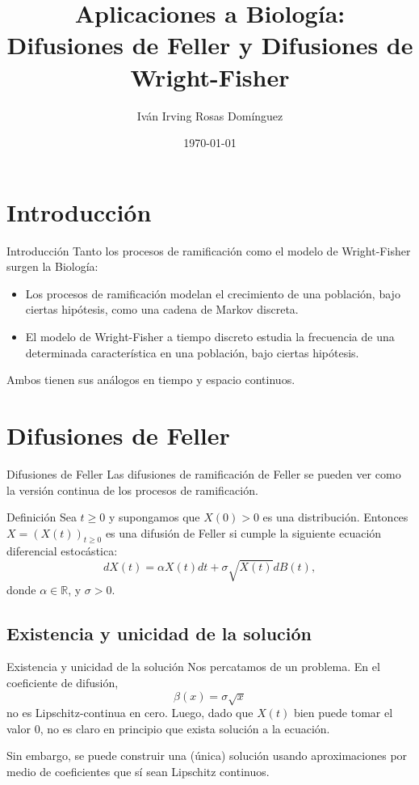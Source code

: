 \documentclass{beamer}
\title[Difusiones de Feller y Wright-Fisher]{Aplicaciones a Biología:\\
Difusiones de Feller y Difusiones de Wright-Fisher}
\subtitle{}
\author[]{Iván Irving Rosas Domínguez}
\institute[]{Centro de Investigación en Matemáticas, A.C.}
\date[]{\today}
\newcommand{\R}{\mathbb{R}}
\renewcommand{\1}{\mathds{1}}
\theoremstyle{definition}
\theoremstyle{definition}
\theoremstyle{definition}
\theoremstyle{definition}
\theoremstyle{definition}
\begin{document}
\frame{\titlepage}

\section{Introducción}
\begin{frame}{Introducción}
    Tanto los procesos de ramificación como el modelo de Wright-Fisher surgen la Biología:
    \newline

	\begin{itemize}
        \item Los procesos de ramificación modelan el crecimiento de una población, bajo ciertas hipótesis, como una cadena de Markov discreta.
        \item El modelo de Wright-Fisher a tiempo discreto estudia la frecuencia de una determinada característica en una población, bajo ciertas hipótesis.
        \newline
        
    \end{itemize}
    Ambos tienen sus análogos en tiempo y espacio continuos.
\end{frame}
\section{Difusiones de Feller}
\begin{frame}{Difusiones de Feller}
    Las difusiones de ramificación de Feller se pueden ver como la versión continua de los procesos de ramificación.
    \newline
    \begin{block}{Definición}
        Sea $t\geq0$ y supongamos que $X(0)>0$ es una distribución. Entonces $X=(X(t))_{t\geq0}$ es una 
        difusión de Feller si cumple la siguiente ecuación diferencial estocástica:
        \[
        dX(t)=\alpha X(t)dt+\sigma\sqrt{X(t)}dB(t),
        \]
        donde $\alpha\in \R$, y $\sigma>0$.    
    \end{block}
    
\end{frame}
\subsection{Existencia y unicidad de la solución}
\begin{frame}{Existencia y unicidad de la solución}
    Nos percatamos de un problema. En el coeficiente de difusión,  
    \[
        \beta(x)=\sigma\sqrt{x} \text{}
    \]
    no es Lipschitz-continua en cero. Luego, dado que $X(t)$ bien puede tomar 
    el valor 0, no es claro en principio que exista solución a la ecuación.\newline
    \pause

    Sin embargo, se puede construir una (única) solución usando aproximaciones por medio 
    de coeficientes que sí sean Lipschitz continuos.
\end{frame}
\end{document}
